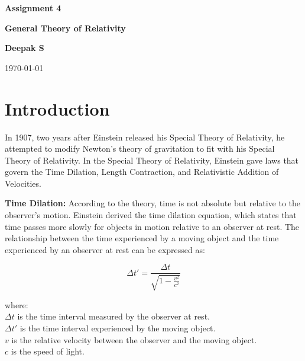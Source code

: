 \documentclass{article}
\begin{document}
\begin{titlepage}
    \centering
    
    \huge \textbf{Assignment 4}
    
    \vspace{5cm} 
    
    \Huge \textbf{General Theory of Relativity}

    \vspace{5cm}

    \Large \textbf{Deepak S}
    
    \vspace{2cm}
    
    \large \today

\end{titlepage}

\section{Introduction}

In 1907, two years after Einstein released his Special Theory of Relativity, he attempted to modify Newton's theory of gravitation to fit with his Special Theory of Relativity. In the Special Theory of Relativity, Einstein gave laws that govern the Time Dilation, Length Contraction, and Relativistic Addition of Velocities. 

\vspace{1cm}

\begin{flushleft}
\textbf{Time Dilation:} According to the theory, time is not absolute but relative to the observer's motion. Einstein derived the time dilation equation, which states that time passes more slowly for objects in motion relative to an observer at rest. The relationship between the time experienced by a moving object and the time experienced by an observer at rest can be expressed as:
\end{flushleft}

\[
\Delta t' = \frac{\Delta t}{\sqrt{1 - \frac{v^2}{c^2}}}
\]

\begin{flushleft}
where:\\
$\Delta t$ is the time interval measured by the observer at rest. \\
$\Delta t'$ is the time interval experienced by the moving object. \\
$v$ is the relative velocity between the observer and the moving object. \\
$c$ is the speed of light.
\end{flushleft}
\end{document}

